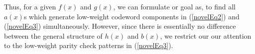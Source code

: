 
Thus, for a given $f(x)$ and $g(x)$, we can formulate or goal as, to find all $a(x)$s which generate low-weight codeword components in  (\ref{novelEq2}) and  (\ref{novelEq3}) simultaneously. 
However, since there is essentially no difference between the general structure of $h(x)$ and $b(x)$, we restrict our our attention to the low-weight parity check patterns in  (\ref{novelEq3}). 


